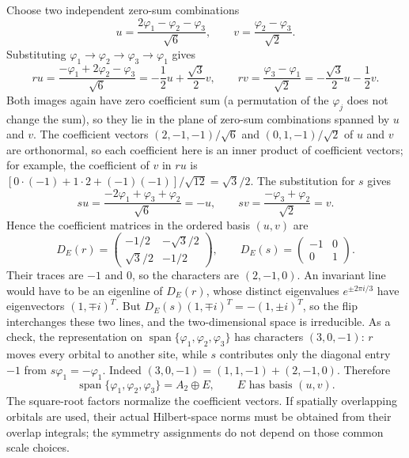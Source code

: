 Choose two independent zero-sum combinations
\[
u=\frac{2\varphi_1-\varphi_2-\varphi_3}{\sqrt6},\qquad
v=\frac{\varphi_2-\varphi_3}{\sqrt2}.
\]
Substituting $\varphi_1\to\varphi_2\to\varphi_3\to\varphi_1$ gives
\[
ru=\frac{-\varphi_1+2\varphi_2-\varphi_3}{\sqrt6}
=-\frac12u+\frac{\sqrt3}{2}v,\qquad
rv=\frac{\varphi_3-\varphi_1}{\sqrt2}
=-\frac{\sqrt3}{2}u-\frac12v.
\]
Both images again have zero coefficient sum (a permutation of the
$\varphi_j$ does not change the sum), so they lie in the plane of
zero-sum combinations spanned by $u$ and $v$.
The coefficient vectors $(2,-1,-1)/\sqrt6$ and $(0,1,-1)/\sqrt2$ of
$u$ and $v$ are orthonormal, so each coefficient here is an inner
product of coefficient vectors; for example, the coefficient of $v$
in $ru$ is $[0\cdot(-1)+1\cdot2+(-1)(-1)]/\sqrt{12}=\sqrt3/2$.
The substitution for $s$ gives
\[
su=\frac{-2\varphi_1+\varphi_3+\varphi_2}{\sqrt6}=-u,\qquad
sv=\frac{-\varphi_3+\varphi_2}{\sqrt2}=v.
\]
Hence the coefficient matrices in the ordered basis $(u,v)$ are
\[
D_E(r)=\begin{pmatrix}-1/2&-\sqrt3/2\\
\sqrt3/2&-1/2\end{pmatrix},\qquad
D_E(s)=\begin{pmatrix}-1&0\\0&1\end{pmatrix}.
\]
Their traces are $-1$ and $0$, so the characters are $(2,-1,0)$.
An invariant line would have to be an eigenline of $D_E(r)$, whose
distinct eigenvalues $e^{\pm2\pi i/3}$ have eigenvectors
$(1,\mp i)^T$. But $D_E(s)(1,\mp i)^T=-(1,\pm i)^T$, so the flip
interchanges these two lines, and the two-dimensional space is
irreducible. As a check, the representation on
$\operatorname{span}\{\varphi_1,\varphi_2,\varphi_3\}$ has characters
$(3,0,-1)$: $r$ moves every orbital to another site, while $s$
contributes only the diagonal entry $-1$ from $s\varphi_1=-\varphi_1$.
Indeed $(3,0,-1)=(1,1,-1)+(2,-1,0)$. Therefore
\[
\boxed{\operatorname{span}\{\varphi_1,\varphi_2,\varphi_3\}
=A_2\oplus E,\qquad E\text{ has basis }(u,v)}.
\]
The square-root factors normalize the coefficient vectors.
If spatially overlapping orbitals are used, their actual Hilbert-space
norms must be obtained from their overlap integrals; the symmetry
assignments do not depend on those common scale choices.

